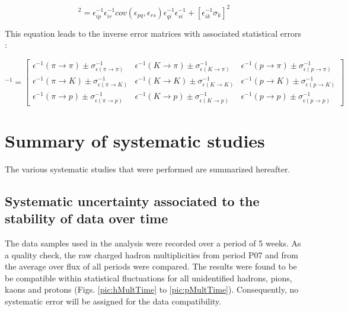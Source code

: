 \begin{equation}
  [\sigma^{-1}_i]^2 = \epsilon^{-1}_{ip}\epsilon^{-1}_{ir}cov(\epsilon_{pq},\epsilon_{rs})\epsilon^{-1}_{qi}\epsilon^{-1}_{si} + [\epsilon^{-1}_{ik}\sigma_k]^2
\end{equation}

This equation leads to the inverse error matrices with associated statistical errors :

\begin{equation}
[M^{\pm}_{RICH}]^{-1}
=
\begin{bmatrix}
\epsilon^{-1}(\pi \rightarrow \pi)\pm\sigma^{-1}_{\epsilon(\pi \rightarrow \pi)} & \epsilon^{-1}(K \rightarrow \pi)\pm\sigma^{-1}_{\epsilon(K \rightarrow \pi)} & \epsilon^{-1}(p \rightarrow \pi)\pm\sigma^{-1}_{\epsilon(p \rightarrow \pi)}\\
\epsilon^{-1}(\pi \rightarrow K)\pm\sigma^{-1}_{\epsilon(\pi \rightarrow K)} & \epsilon^{-1}(K \rightarrow K)\pm\sigma^{-1}_{\epsilon(K \rightarrow K)} & \epsilon^{-1}(p \rightarrow K)\pm\sigma^{-1}_{\epsilon(p \rightarrow K)} \\
\epsilon^{-1}(\pi \rightarrow p)\pm\sigma^{-1}_{\epsilon(\pi \rightarrow p)} & \epsilon^{-1}(K \rightarrow p)\pm\sigma^{-1}_{\epsilon(K \rightarrow p)} & \epsilon^{-1}(p \rightarrow p)\pm\sigma^{-1}_{\epsilon(p \rightarrow p)}
\end{bmatrix}
\end{equation}


\section{Summary of systematic studies}

The various systematic studies that were performed are summarized hereafter.


\subsection{Systematic uncertainty associated to the stability of data over time}

The data samples used in the analysis were recorded over a period of 5 weeks. As a quality check, the raw charged hadron multiplicities from period P07 and from the average over flux of all periods were compared. The results were found to be be compatible within statistical fluctuations for all unidentified hadrons, pions, kaons and protons (Figs. \ref{pic:hMultTime} to \ref{pic:pMultTime}). Consequently, no systematic error will be assigned for the data compatibility.

